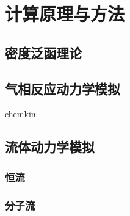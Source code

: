 \chapter{计算原理与方法}
\section{密度泛函理论}

\section{气相反应动力学模拟}
chemkin
\section{流体动力学模拟}
    \subsection{恒流}
    \subsection{分子流}
